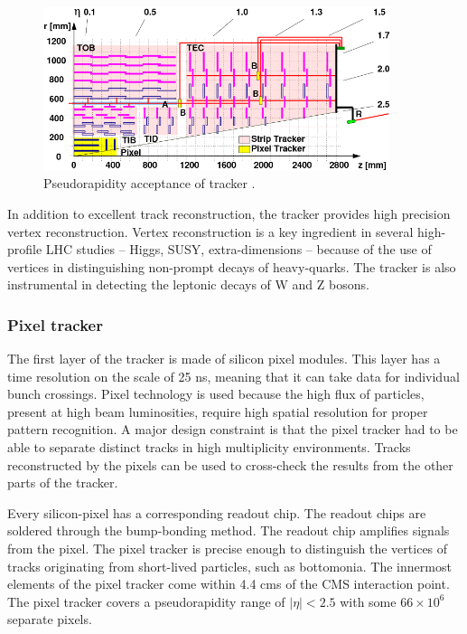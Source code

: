\begin{figure}[]
\begin{centering}
\includegraphics[width=4in]{Chapter3/importfigs/cms_cft_09_003_fig1.png}
\par\end{centering}
\caption{Pseudorapidity acceptance of tracker \cite{Chatrchyan:2009sr}. \label{fig:trackerYZ}}
\end{figure}

In addition to excellent track reconstruction, the tracker provides high precision vertex reconstruction. Vertex reconstruction is a key ingredient in several high-profile LHC studies -- Higgs, SUSY, extra-dimensions -- because of the use of vertices in distinguishing non-prompt decays of heavy-quarks. The tracker is also instrumental in detecting the leptonic decays of W and Z bosons. 

\subsubsection{Pixel tracker}

The first layer of the tracker is made of silicon pixel modules. This layer has a time resolution on the scale of 25 ns, meaning that it can take data for individual bunch crossings. Pixel technology is used because the high flux of particles, present at high beam luminosities, require high spatial resolution for proper pattern recognition. A major design constraint is that the pixel tracker had to be able to separate distinct tracks in high multiplicity environments. Tracks reconstructed by the pixels can be used to cross-check the results from the other parts of the tracker. 

Every silicon-pixel has a corresponding readout chip. The readout chips are soldered through the bump-bonding method. The readout chip amplifies signals from the pixel. The pixel tracker is precise enough to distinguish the vertices of tracks originating from short-lived particles, such as bottomonia. The innermost elements of the pixel tracker come within 4.4 cms of the CMS interaction point. The pixel tracker covers a pseudorapidity range of $|\eta|<2.5$ with some $66 \times 10^6$ separate pixels.

